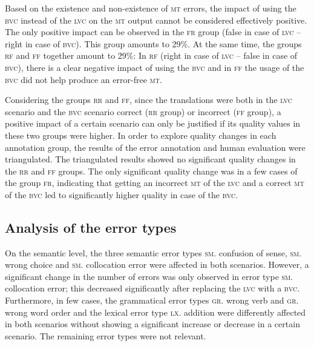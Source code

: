 \documentclass[output=paper]{langsci/langscibook}
\begin{document}
Based on the existence and non-existence of \textsc{mt} errors, the impact of using the \textsc{bvc} instead of the \textsc{lvc} on the \textsc{mt} output cannot be considered effectively positive. The only positive impact can be observed in the \textsc{fr} group (false in case of \textsc{lvc} -- right in case of \textsc{bvc}). This group amounts to 29\%. At the same time, the groups \textsc{rf} and \textsc{ff} together amount to 29\%: In \textsc{rf} (right in case of \textsc{lvc} -- false in case of \textsc{bvc}), there is a clear negative impact of using the \textsc{bvc} and in \textsc{ff} the usage of the \textsc{bvc} did not help produce an error-free \textsc{mt}.

Considering the groups \textsc{rr} and \textsc{ff}, since the translations were both in the \textsc{lvc} scenario and the \textsc{bvc} scenario correct (\textsc{rr} group) or incorrect (\textsc{ff} group), a positive impact of a certain scenario can only be justified if its quality values in these two groups were higher. In order to explore quality changes in each annotation group, the results of the error annotation and human evaluation were triangulated. The triangulated results showed no significant quality changes in the \textsc{rr} and \textsc{ff} groups. The only significant quality change was in a few cases of the group \textsc{fr}, indicating that getting an incorrect \textsc{mt} of the \textsc{lvc} and a correct \textsc{mt} of the \textsc{bvc} led to significantly higher quality in case of the \textsc{bvc}. 

\subsection{Analysis of the error types}
On the semantic level, the three semantic error types \textsc{sm}. confusion of sense, \textsc{sm}. wrong choice and \textsc{sm}. collocation error were affected in both scenarios. However, a significant change in the number of errors was only observed in error type \textsc{sm}. collocation error; this decreased significantly after replacing the \textsc{lvc} with a \textsc{bvc}. Furthermore, in few cases, the grammatical error types \textsc{gr}. wrong verb and \textsc{gr}. wrong word order and the lexical error type \textsc{lx}. addition were differently affected in both scenarios without showing a significant increase or decrease in a certain scenario. The remaining error types were not relevant.
\end{document}
